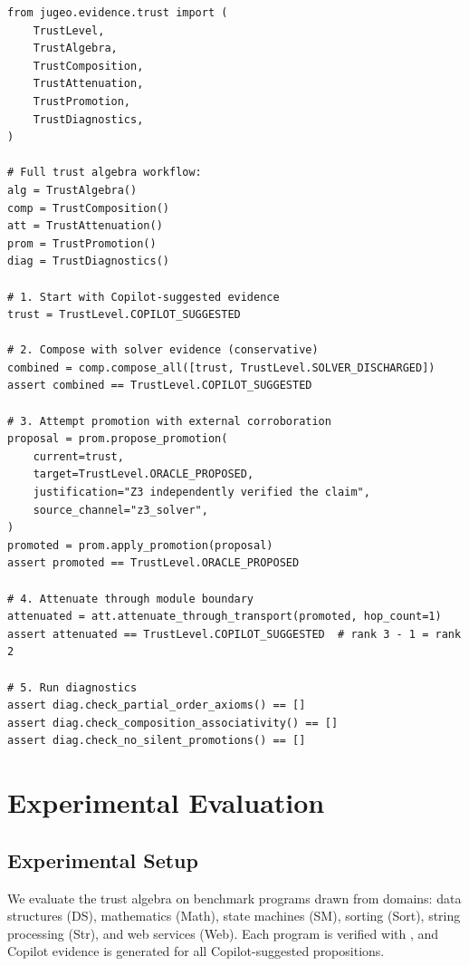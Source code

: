 \documentclass[11pt]{article}
\begin{document}
\begin{lstlisting}[style=jugeo-python]
from jugeo.evidence.trust import (
    TrustLevel,
    TrustAlgebra,
    TrustComposition,
    TrustAttenuation,
    TrustPromotion,
    TrustDiagnostics,
)

# Full trust algebra workflow:
alg = TrustAlgebra()
comp = TrustComposition()
att = TrustAttenuation()
prom = TrustPromotion()
diag = TrustDiagnostics()

# 1. Start with Copilot-suggested evidence
trust = TrustLevel.COPILOT_SUGGESTED

# 2. Compose with solver evidence (conservative)
combined = comp.compose_all([trust, TrustLevel.SOLVER_DISCHARGED])
assert combined == TrustLevel.COPILOT_SUGGESTED

# 3. Attempt promotion with external corroboration
proposal = prom.propose_promotion(
    current=trust,
    target=TrustLevel.ORACLE_PROPOSED,
    justification="Z3 independently verified the claim",
    source_channel="z3_solver",
)
promoted = prom.apply_promotion(proposal)
assert promoted == TrustLevel.ORACLE_PROPOSED

# 4. Attenuate through module boundary
attenuated = att.attenuate_through_transport(promoted, hop_count=1)
assert attenuated == TrustLevel.COPILOT_SUGGESTED  # rank 3 - 1 = rank 2

# 5. Run diagnostics
assert diag.check_partial_order_axioms() == []
assert diag.check_composition_associativity() == []
assert diag.check_no_silent_promotions() == []
\end{lstlisting}

\section{Experimental Evaluation}\label{sec:eval}

\subsection{Experimental Setup}

We evaluate the trust algebra on \expTotalPrograms{} benchmark programs drawn
from \expDomainCount{} domains: data structures (DS), mathematics (Math),
state machines (SM), sorting (Sort), string processing (Str), and web
services (Web).  Each program is verified with \JuGeo{}, and Copilot evidence
is generated for all Copilot-suggested propositions.
\end{document}

